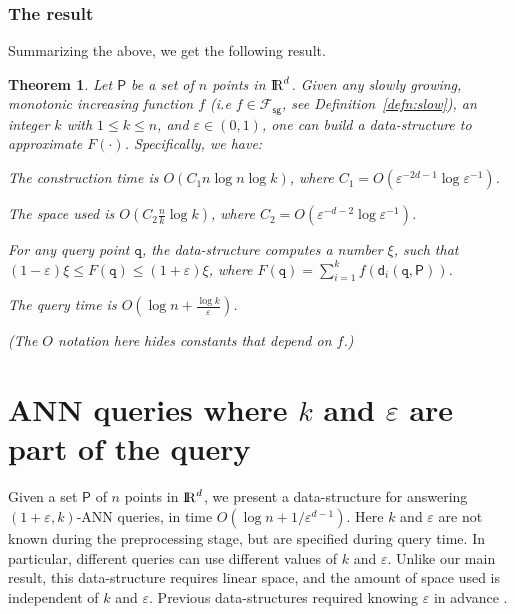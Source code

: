 \documentclass[12pt]{article}
\makeatletter
\newtheorem{theorem}{Theorem}[section] \newtheorem{lemma}[theorem]{Lemma}
\newcommand{\Term}[1]{\textsf{#1}}
\newcommand{\TermI}[1]{\Term{#1}\index{#1@\Term{#1}}}
\theoremstyle{remark}{\theorembodyfont{\rm} \newtheorem{remark}[theorem]{Remark}}
\newcommand{\thmlab}[1]{{\label{theo:#1}}}
\newcommand{\seclab}[1]{{\label{section:#1}}}
\newcommand{\defref}[1]{Definition~\ref{defn:#1}}
\newcommand{\pth}[2][\!]{#1\left({#2}\right)}
\newcommand{\distPk}[3]{\mathsf{d}_{#3}\pth{#2,#1}}
\newcommand{\order}[1]{O\pth{#1}}
\newcommand{\eps}{{\varepsilon}}\newcommand{\divides}{|}
\newcommand{\DDM}[2]{F}
\newcommand{\FSF}{\mathcal{F}_{\mathsf{sg}}}
\newcommand{\ANN}{\TermI{ANN}\xspace}
\renewcommand{\Re}{{\rm I\!\hspace{-0.025em} R}}
\newcommand{\PntSet}{\mathsf{P}}
\newcommand{\query}{\mathtt{q}}
\newcommand{\ds}{\displaystyle}
\makeatother
\begin{document}
\subsubsection{The result}
Summarizing the above, we get the following result.
\begin{theorem}
    \thmlab{thm:appln:ddm}Let $\PntSet$ be a set of $n$ points in $\Re^d$.  Given any slowly
    growing, monotonic increasing function $f$
    (i.e $f \in \FSF$, see \defref{slow}), an integer $k$ with 
    $1 \leq k \leq n$, and $\eps \in (0,1)$,
    one can build a data-structure to approximate
    $\DDM{k}{f}(\cdot)$. Specifically, we have:
    \begin{compactenum}[\qquad\rm (A)]
        \item The construction time is $\order{ C_1 n \log n \log k}$,
        where $C_1 = \order{\eps^{-2d-1}\log \eps^{-1}}$.
        \item The space used is $\ds \order{C_{2} \frac{n }{k } \log
           k}$, where $C_{2}= \order{\eps^{-d-2}\log \eps^{-1}}$.
        \item For any query point $\query$, the data-structure
        computes a number $\xi$, such that $(1-\eps) \xi \leq
        \DDM{k}{f}(\query) \leq (1+\eps) \xi$, where
        $\DDM{k}{f}(\query) = \sum_{i=1}^k
        f(\distPk{\PntSet}{\query}{i})$.
        \item The query time is $\ds \order{\log n + \frac{\log
              k}{\eps}}$.
    \end{compactenum}
    (The $O$ notation here hides constants that depend on $f$.)
\end{theorem}

\section{\ANN queries where $k$ and $\eps$ are part of the query}
\seclab{qtree:algo}

Given a set $\PntSet$ of $n$ points in $\Re^d$, we present a
data-structure for answering $(1+\eps,k)$-\ANN queries, 
in time $\order{\log n +
   1/\eps^{d-1}}$. Here $k$ and $\eps$ are not known
during the preprocessing stage, but are specified during query
time. In particular, different queries
can use different values of $k$ and $\eps$. Unlike our main result,
this data-structure requires linear space, and the amount of space used 
is independent of $k$
and $\eps$. Previous data-structures required knowing $\eps$ in
advance \cite{amm-sttas-05}.
\end{document}
